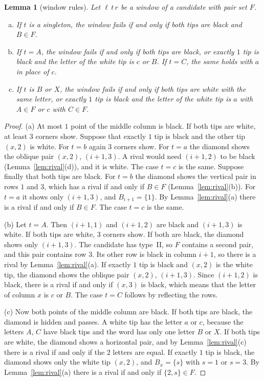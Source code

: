 \documentclass[12pt]{article}
\theoremstyle{plain}
\newtheorem{lemma}[theorem]{Lemma}
\theoremstyle{definition}
\theoremstyle{remark}
\begin{document}
\begin{lemma}[window rules]\label{lem:windows}
Let $\ell\,t\,r$ be a window of a candidate with pair set $F$.
\begin{enumerate}[(a)]
\item If $t$ is a singleton, the window fails if and only if both tips are black and
$B\in F$.
\item If $t=A$, the window fails if and only if both tips are black, or exactly $1$
tip is black and the letter of the white tip is $c$ or $B$. If $t=C$, the same
holds with $a$ in place of $c$.
\item If $t$ is $B$ or $X$, the window fails if and only if both tips are white
with the same letter, or exactly $1$ tip is black and the letter of the white tip
is $a$ with $A\in F$ or $c$ with $C\in F$.
\end{enumerate}
\end{lemma}

\begin{proof}
(a) At most $1$ point of the middle column is black. If both tips are white, at
least $3$ corners show. Suppose that exactly $1$ tip is black and the other tip
$(x,2)$ is white. For $t=b$ again $3$ corners show. For $t=a$ the diamond shows
the oblique pair $(x,2)$, $(i+1,3)$. A rival would need $(i+1,2)$ to be black
(Lemma~\ref{lem:rival}(d)), and it is white. The case $t=c$ is the same.
Suppose finally that both tips are black. For $t=b$ the diamond shows the
vertical pair in rows $1$ and $3$, which has a rival if and only if $B\in F$
(Lemma~\ref{lem:rival}(b)). For $t=a$ it shows only $(i+1,3)$, and
$B_{i+1}=\{1\}$. By Lemma~\ref{lem:rival}(a) there is a rival if and only if
$B\in F$. The case $t=c$ is the same.

(b) Let $t=A$. Then $(i+1,1)$ and $(i+1,2)$ are black and $(i+1,3)$ is white. If
both tips are white, $3$ corners show. If both are black, the diamond shows only
$(i+1,3)$. The candidate has type~II, so $F$ contains a second pair, and this
pair contains row $3$. Its other row is black in column $i+1$, so there is a
rival by Lemma~\ref{lem:rival}(a). If exactly $1$ tip is black and $(x,2)$ is
the white tip, the diamond shows the oblique pair $(x,2)$, $(i+1,3)$. Since
$(i+1,2)$ is black, there is a rival if and only if $(x,3)$ is black, which
means that the letter of column $x$ is $c$ or $B$. The case $t=C$ follows by
reflecting the rows.

(c) Now both points of the middle column are black. If both tips are black, the
diamond is hidden and passes. A white tip has the letter $a$ or $c$, because the
letters $A$, $C$ have black tips and the word has only one letter $B$ or $X$.
If both tips are white, the diamond shows a horizontal pair, and by
Lemma~\ref{lem:rival}(c) there is a rival if and only if the $2$ letters are
equal. If exactly $1$ tip is black, the diamond shows only the white tip
$(x,2)$, and $B_x=\{s\}$ with $s=1$ or $s=3$. By Lemma~\ref{lem:rival}(a) there
is a rival if and only if $\{2,s\}\in F$.
\end{proof}
\end{document}
